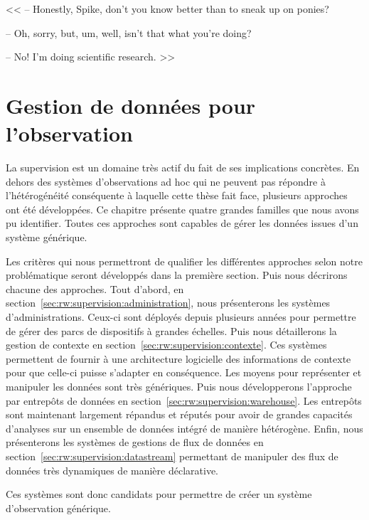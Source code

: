 \begin{savequote}[6cm]
<< -- Honestly, Spike, don't you know better than to sneak up on ponies?

-- Oh, sorry, but, um, well, isn't that what you're doing?

-- No! I'm doing scientific research. >>
\end{savequote}

\chapter{Gestion de données pour l'observation}\label{chap:rw:supervision}
\chaptertoc

La supervision est un domaine très actif du fait de ses implications concrètes. En dehors des systèmes d'observations ad hoc qui ne peuvent pas répondre à l'hétérogénéité conséquente à laquelle cette thèse fait face, plusieurs approches ont été développées. Ce chapitre présente quatre grandes familles que nous avons pu identifier. Toutes ces approches sont capables de gérer les données issues d'un système générique.

Les critères qui nous permettront de qualifier les différentes approches selon notre problématique seront développés dans la première section. Puis nous décrirons chacune des approches. Tout d'abord, en section~\ref{sec:rw:supervision:administration}, nous présenterons les systèmes d'administrations. Ceux-ci sont déployés depuis plusieurs années pour permettre de gérer des parcs de dispositifs à grandes échelles. Puis nous détaillerons la gestion de contexte en section~\ref{sec:rw:supervision:contexte}. Ces systèmes permettent de fournir à une architecture logicielle des informations de contexte pour que celle-ci puisse s'adapter en conséquence. Les moyens pour représenter et manipuler les données sont très génériques. Puis nous développerons l'approche par entrepôts de données en section~\ref{sec:rw:supervision:warehouse}. Les entrepôts sont maintenant largement répandus et réputés pour avoir de grandes capacités d'analyses sur un ensemble de données intégré de manière hétérogène. Enfin, nous présenterons les systèmes de gestions de flux de données en section~\ref{sec:rw:supervision:datastream} permettant de manipuler des flux de données très dynamiques de manière déclarative.

Ces systèmes sont donc candidats pour permettre de créer un système d'observation générique.







